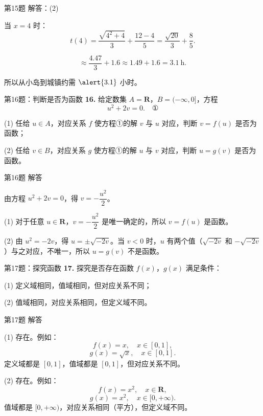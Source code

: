 \documentclass[10pt,aspectratio=169,serif]{beamer}
\begin{document}
\begin{frame}[t]{第15题 解答：(2)}
\begin{tcolorbox}[colback=orange!10,colframe=orange,title=\textbf{解：(2)}]
当 $x = 4$ 时：
\[
t(4) = \frac{\sqrt{4^2 + 4}}{3} + \frac{12 - 4}{5} = \frac{\sqrt{20}}{3} + \frac{8}{5}.
\]

\[
\approx \frac{4.47}{3} + 1.6 \approx 1.49 + 1.6 = 3.1\ \text{h}.
\]

\vspace{0.5em}
所以从小岛到城镇约需 $\alert{3.1}$ 小时。
\end{tcolorbox}
\end{frame}

\begin{frame}[t]{第16题：判断是否为函数}
\textbf{16.} 给定数集 $A = \mathbf{R}$，$B = (-\infty, 0]$，方程
\[
u^2 + 2v = 0. \quad \text{①}
\]

(1) 任给 $u \in A$，对应关系 $f$ 使方程①的解 $v$ 与 $u$ 对应，判断 $v = f(u)$ 是否为函数；

(2) 任给 $v \in B$，对应关系 $g$ 使方程①的解 $u$ 与 $v$ 对应，判断 $u = g(v)$ 是否为函数。
\end{frame}

\begin{frame}[t]{第16题 解答}
\begin{tcolorbox}[colback=orange!10,colframe=orange,title=\textbf{解}]
由方程 $u^2 + 2v = 0$，得 $v = -\dfrac{u^2}{2}$。

\vspace{0.5em}
(1) 对于任意 $u \in \mathbf{R}$，$v = -\dfrac{u^2}{2}$ 是唯一确定的，所以 $v = f(u)$ \alert{是}函数。

\vspace{0.5em}
(2) 由 $u^2 = -2v$，得 $u = \pm\sqrt{-2v}$。当 $v < 0$ 时，$u$ 有两个值（$\sqrt{-2v}$ 和 $-\sqrt{-2v}$）与之对应，不唯一，所以 $u = g(v)$ \alert{不是}函数。
\end{tcolorbox}
\end{frame}

\begin{frame}[t]{第17题：探究函数}
\textbf{17.} 探究是否存在函数 $f(x)$，$g(x)$ 满足条件：

(1) 定义域相同，值域相同，但对应关系不同；

(2) 值域相同，对应关系相同，但定义域不同。
\end{frame}

\begin{frame}[t]{第17题 解答}
\begin{tcolorbox}[colback=orange!10,colframe=orange,title=\textbf{解}]
(1) \alert{存在}。例如：
\[
f(x) = x,\quad x \in [0,1],
\]
\[
g(x) = \sqrt{x},\quad x \in [0,1].
\]
定义域都是 $[0,1]$，值域都是 $[0,1]$，但对应关系不同。

\vspace{0.5em}
(2) \alert{存在}。例如：
\[
f(x) = x^2,\quad x \in \mathbf{R},
\]
\[
g(x) = x^2,\quad x \in [0, +\infty).
\]
值域都是 $[0, +\infty)$，对应关系相同（平方），但定义域不同。
\end{tcolorbox}
\end{frame}
\end{document}
